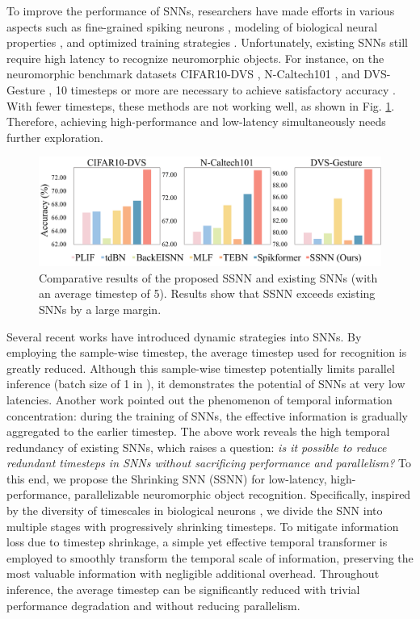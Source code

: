 \documentclass[letterpaper]{article} %
\begin{document}
To improve the performance of SNNs, researchers have made efforts in various aspects such as fine-grained spiking neurons \cite{PLIF,GLIF,ding2022biologically}, modeling of biological neural properties \cite{BackEISNN,sun2023multicompartment}, and optimized training strategies \cite{TET,Guo_2022_CVPR}. Unfortunately, existing SNNs still require high latency to recognize neuromorphic objects. For instance, on the neuromorphic benchmark datasets CIFAR10-DVS \cite{CIFAR10-DVS}, N-Caltech101 \cite{N-Caltech101}, and DVS-Gesture \cite{DVS-Gesture}, 10 timesteps or more are necessary to achieve satisfactory accuracy \cite{MLF,GLIF}. With fewer timesteps, these methods are not working well, as shown in Fig. \ref{cal1}. Therefore, achieving high-performance and low-latency simultaneously needs further exploration.
\begin{figure}[t]
\centering
\includegraphics[width=0.98\columnwidth]{cal1}
\caption{Comparative results of the proposed SSNN and existing SNNs (with an average timestep of 5). Results show that SSNN exceeds existing SNNs by a large margin.}
\label{cal1}
\end{figure}

Several recent works \cite{li2023unleashing,SEENN} have introduced dynamic strategies into SNNs. By employing the sample-wise timestep, the average timestep used for recognition is greatly reduced. Although this sample-wise timestep potentially limits parallel inference (batch size of 1 in \cite{li2023unleashing}), it demonstrates the potential of SNNs at very low latencies. Another work \cite{kim2022exploring} pointed out the phenomenon of temporal information concentration: during the training of SNNs, the effective information is gradually aggregated to the earlier timestep. The above work reveals the high temporal redundancy of existing SNNs, which raises a question: \textit{is it possible to reduce redundant timesteps in SNNs without sacrificing performance and parallelism?} To this end, we propose the Shrinking SNN (SSNN) for low-latency, high-performance, parallelizable neuromorphic object recognition. Specifically, inspired by the diversity of timescales in biological neurons \cite{10.3389/fncir.2020.615626}, we divide the SNN into multiple stages with progressively shrinking timesteps. To mitigate information loss due to timestep shrinkage, a simple yet effective temporal transformer is employed to smoothly transform the temporal scale of information, preserving the most valuable information with negligible additional overhead. Throughout inference, the average timestep can be significantly reduced with trivial performance degradation and without reducing parallelism.
\end{document}
